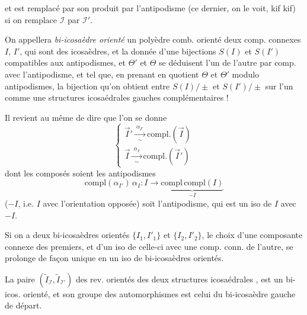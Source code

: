 \documentclass[11pt,a4paper]{article}
\begin{document}
et est remplacé par son produit par l'antipodisme (ce dernier, on le voit, kif kif) si on remplace $\mathcal I$ par $\mathcal I'$.

On appellera \emph{bi-icosaèdre orienté}   un polyèdre comb. orienté  deux comp. connexes $I$, $I'$, qui sont des icosaèdres, et la donnée d'une    bijections   $S(I)$ et $S(I')$ compatibles aux antipodismes, et \struck{\ill{}}  $\Theta'$ et $\Theta$ se déduisent l'un de l'autre par comp. avec l'antipodisme, et tel que, en prenant en quotient  $\Theta$ et $\Theta'$ modulo antipodismes, la bijection qu'on obtient entre $S(I)/\pm$ et $S(I')/\pm$  \ill{} sur l'un comme une structures icosaédrales gauches \ill{} complémentaires !

Il revient au même de dire que l'on se donne  
\[
\begin{cases}
\vec I' \xrightarrow[\sim]{\ \alpha_{I'}\ } \mathrm{compl.}(\vec I)\\
\vec I \xrightarrow[\sim]{\ \alpha_I\ } \mathrm{compl.}(\vec I')
\end{cases}
\]
 
dont les composés soient les antipodismes
\[
\mathrm{compl}(\alpha_{I'})\,\alpha_I : I \longrightarrow \underbrace{\mathrm{compl}\,\mathrm{compl}(I)}_{\textstyle -I}
\]
($-I$, i.e. $I$ avec l'orientation opposée) soit l'antipodisme, qui est un iso de $I$ avec $-I$.

Si on a deux bi-icosaèdres orientés $\{I_1,I'_1\}$ et $\{I_2,I'_2\}$, le choix d'une  composante connexe des premiers, et d'un iso de celle-ci avec une comp. conn. de l'autre, se prolonge de façon unique en un iso de bi-icosaèdres orientés.

La paire \struck{\ill{}} $(\widetilde I_{\mathcal I}, \widetilde I_{\mathcal I'})$ des rev. orientés des deux structures icosaédrales  , est un bi-icos. orienté, et son groupe des automorphismes est celui du  bi-icosaèdre gauche de départ.
\end{document}
